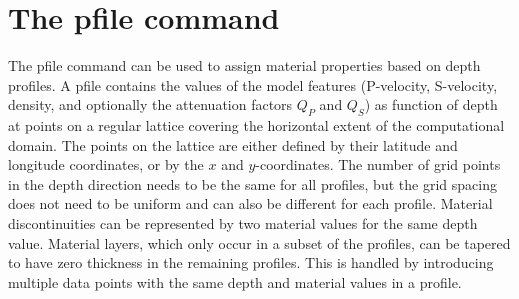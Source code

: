 \documentclass[11pt]{report}
\begin{document}
{\section{The pfile command}\label{sec:pfile}
The pfile command can be used to assign material properties based on depth profiles. A pfile
contains the values of the model features (P-velocity, S-velocity, density, and optionally the
attenuation factors $Q_P$ and $Q_S$) as function of depth at points on a regular lattice covering
the horizontal extent of the computational domain. The points on the lattice are either defined by
their latitude and longitude coordinates, or by the $x$ and $y$-coordinates. The number of grid
points in the depth direction needs to be the same for all profiles, but the grid spacing does not
need to be uniform and can also be different for each profile. Material discontinuities can be
represented by two material values for the same depth value. Material layers, which only occur in a
subset of the profiles, can be tapered to have zero thickness in the remaining profiles. This is
handled by introducing multiple data points with the same depth and material values in a profile.

}
\end{document}
